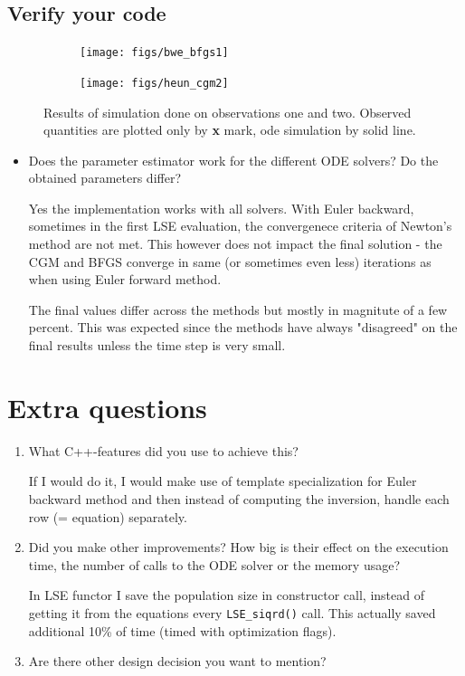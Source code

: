 \documentclass[a4paper]{article}
\newcommand{\answer}[1]{\vspace{-0.75em}\begin{framed} #1 \end{framed}\vspace{-0.75em}}
\begin{document}
\subsection*{Verify your code}
\begin{figure}[!h]
	\centering
	\begin{subfigure}{0.49\linewidth}
		\centering
		\texttt{[image: figs/bwe\_bfgs1]}
	\end{subfigure}
	\begin{subfigure}{0.49\linewidth}
		\centering
		\texttt{[image: figs/heun\_cgm2]}
	\end{subfigure}
\caption{Results of simulation done on observations one and two. Observed quantities are plotted only by \textbf{x} mark, ode simulation by solid line.}
\end{figure}
\begin{itemize}
	\item Does the parameter estimator work for the different ODE solvers? Do the obtained parameters differ?
	\answer{
		Yes the implementation works with all solvers. With Euler backward, sometimes in the first LSE evaluation, the convergenece criteria of Newton's method are not met. This however does not impact the final solution - the CGM and BFGS converge in same (or sometimes even less) iterations as when using Euler forward method.
		
		The final values differ across the methods but mostly in magnitute of a few percent. This was expected since the methods have always "disagreed" on the final results unless the time step is very small. 
	}
\end{itemize}
\section*{Extra questions}
\begin{enumerate}
	\item What C++-features did you use to achieve this?
	\answer{
	If I would do it, I would make use of template specialization for Euler backward method and then instead of computing the inversion, handle each row (= equation) separately.	
}
	\item Did you make other improvements? How big is their effect on the execution time, the number of calls to the ODE solver or the memory usage?
	\answer{
	In LSE functor I save the population size in constructor call, instead of getting it from the equations every \texttt{LSE\_siqrd()} call. This actually saved additional 10\% of time (timed with optimization flags).
}
	\item Are there other design decision you want to mention?
	\answer{}
\end{enumerate}
\end{document}

